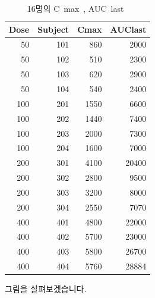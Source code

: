 \documentclass[12pt,]{krantz}
\theoremstyle{definition}
\theoremstyle{definition}
\theoremstyle{definition}
\theoremstyle{remark}
\begin{document}
\begin{table}

\caption{\label{tab:sad-pk}16명의 C~max~, AUC~last~}
\centering
\begin{tabular}[t]{r|r|r|r}
\hline
Dose & Subject & Cmax & AUClast\\
\hline
50 & 101 & 860 & 2000\\
\hline
50 & 102 & 510 & 2300\\
\hline
50 & 103 & 620 & 2900\\
\hline
50 & 104 & 540 & 2400\\
\hline
100 & 201 & 1550 & 6600\\
\hline
100 & 202 & 1440 & 7400\\
\hline
100 & 203 & 2000 & 7300\\
\hline
100 & 204 & 1600 & 7000\\
\hline
200 & 301 & 4100 & 20400\\
\hline
200 & 302 & 2800 & 9500\\
\hline
200 & 303 & 3200 & 8000\\
\hline
200 & 304 & 2550 & 7070\\
\hline
400 & 401 & 4800 & 22000\\
\hline
400 & 402 & 5700 & 23000\\
\hline
400 & 403 & 5800 & 26700\\
\hline
400 & 404 & 5760 & 28884\\
\hline
\end{tabular}
\end{table}

그림을 살펴보겠습니다.
\end{document}
